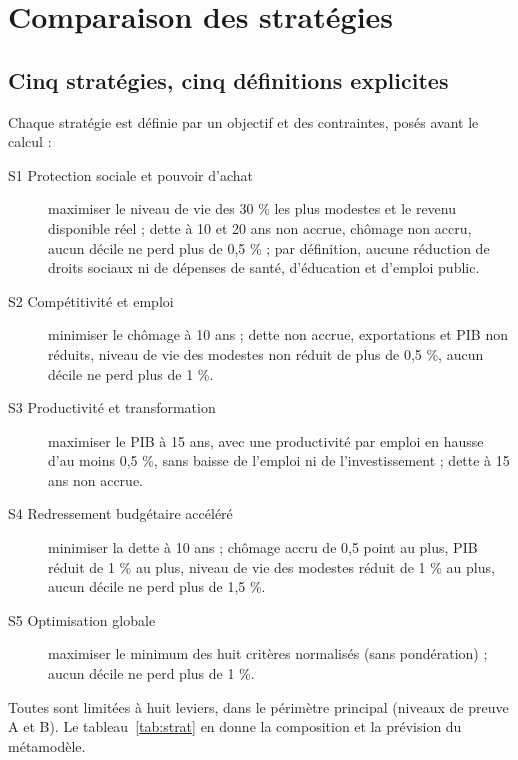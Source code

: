 \chapter{Comparaison des stratégies}\label{ch:strategies}

\section{Cinq stratégies, cinq définitions explicites}

Chaque stratégie est définie par un objectif et des contraintes, posés avant le calcul :
\begin{description}
\item[S1 Protection sociale et pouvoir d'achat] maximiser le niveau de vie des 30 \% les plus modestes et le revenu
disponible réel ; dette à 10 et 20 ans non accrue, chômage non accru, aucun décile ne perd plus de 0,5 \% ; par
définition, aucune réduction de droits sociaux ni de dépenses de santé, d'éducation et d'emploi public.
\item[S2 Compétitivité et emploi] minimiser le chômage à 10 ans ; dette non accrue, exportations et PIB non réduits,
niveau de vie des modestes non réduit de plus de 0,5 \%, aucun décile ne perd plus de 1 \%.
\item[S3 Productivité et transformation] maximiser le PIB à 15 ans, avec une productivité par emploi en hausse d'au
moins 0,5 \%, sans baisse de l'emploi ni de l'investissement ; dette à 15 ans non accrue.
\item[S4 Redressement budgétaire accéléré] minimiser la dette à 10 ans ; chômage accru de 0,5 point au plus, PIB réduit
de 1 \% au plus, niveau de vie des modestes réduit de 1 \% au plus, aucun décile ne perd plus de 1,5 \%.
\item[S5 Optimisation globale] maximiser le minimum des huit critères normalisés (sans pondération) ; aucun décile ne
perd plus de 1 \%.
\end{description}
Toutes sont limitées à huit leviers, dans le périmètre principal (niveaux de preuve A et B). Le
tableau~\ref{tab:strat} en donne la composition et la prévision du métamodèle.

\begin{table}[htbp]\centering\scriptsize
\caption{Composition des stratégies (écart à la situation actuelle) et prévision du métamodèle en 2037.}\label{tab:strat}
\end{table}

